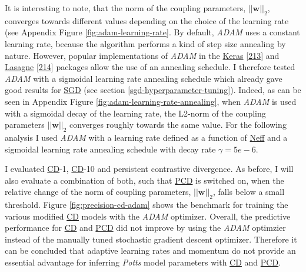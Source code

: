 \documentclass[11pt,a4paper,twoside]{book}
\newcommand{\eq}{\!=\!}
\newcommand{\w}{\mathbf{w}}
\theoremstyle{definition}
\theoremstyle{definition}
\theoremstyle{remark}
\begin{document}
It is interesting to note, that the norm of the coupling parameters,
\(||\w||_2\), converges towards different values depending on the choice
of the learning rate (see Appendix Figure \ref{fig:adam-learning-rate}.
By default, \emph{ADAM} uses a constant learning rate, because the
algorithm performs a kind of step size annealing by nature. However,
popular implementations of \emph{ADAM} in the
\href{https://github.com/fchollet/keras/blob/master/keras/optimizers.py\#L385}{Keras}
{[}\protect\hyperlink{ref-Chollet2015}{213}{]} and
\href{https://github.com/Lasagne/Lasagne/blob/master/lasagne/updates.py\#L565-L629}{Lasagne}
{[}\protect\hyperlink{ref-Dieleman2015}{214}{]} packages allow the use
of an annealing schedule. I therefore tested \emph{ADAM} with a
sigmoidal learning rate annealing schedule which already gave good
results for \protect\hyperlink{abbrev}{SGD} (see section
\ref{sgd-hyperparameter-tuning}). Indeed, as can be seen in Appendix
Figure \ref{fig:adam-learning-rate-annealing}, when \emph{ADAM} is used
with a sigmoidal decay of the learning rate, the L2-norm of the coupling
parameters \(||\w||_2\) converges roughly towards the same value. For
the following analysis I used \emph{ADAM} with a learning rate defined
as a function of \protect\hyperlink{abbrev}{Neff} and a sigmoidal
learning rate annealing schedule with decay rate \(\gamma \eq 5e-6\).




















I evaluated \protect\hyperlink{abbrev}{CD}-1,
\protect\hyperlink{abbrev}{CD}-10 and persistent contrastive divergence.
As before, I will also evaluate a combination of both, such that
\protect\hyperlink{abbrev}{PCD} is switched on, when the relative change
of the norm of coupling parameters, \(||\w||_2\), falls below a small
threshold. Figure \ref{fig:precision-cd-adam} shows the benchmark for
training the various modified \protect\hyperlink{abbrev}{CD} models with
the \emph{ADAM} optimizer. Overall, the predictive performance for
\protect\hyperlink{abbrev}{CD} and \protect\hyperlink{abbrev}{PCD} did
not improve by using the \emph{ADAM} optimzier instead of the manually
tuned stochastic gradient descent optimizer. Therefore it can be
concluded that adaptive learning rates and momentum do not provide an
essential advantage for inferring \emph{Potts} model parameters with
\protect\hyperlink{abbrev}{CD} and \protect\hyperlink{abbrev}{PCD}.
\end{document}
